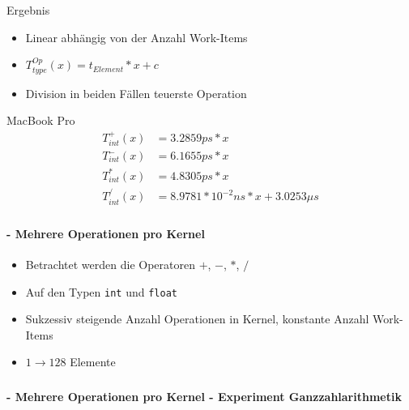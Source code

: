 \documentclass{beamer}
\begin{document}
\begin{frame}
	\frametitle{}
	\framesubtitle{}
	\begin{block}{Ergebnis}
		\begin{itemize}
			\item Linear abhängig von der Anzahl Work-Items
			\item $T^{Op}_{type}(x) = t_{Element}*x+c$
			\item Division in beiden Fällen teuerste Operation
		\end{itemize}	
	\end{block}
	\begin{block}{MacBook Pro}
		\begin{align*}
			T^{+}_{int}(x) &= 3.2859 ps*x\\
			T^{-}_{int}(x) &= 6.1655 ps*x\\
			T^{*}_{int}(x) &= 4.8305 ps*x\\
			T^{/}_{int}(x) &= 8.9781 * 10^{-2}ns*x+3.0253\mu s	
		\end{align*}
	\end{block}
\end{frame}

\begin{frame}
	\frametitle{}
	\framesubtitle{ - Mehrere Operationen pro Kernel}
	\begin{itemize}
		\item Betrachtet werden die Operatoren $+$, $-$, $*$, $/$
		\item  Auf den Typen \texttt{int} und \texttt{float}
		\item Sukzessiv steigende Anzahl Operationen in Kernel, konstante Anzahl Work-Items
		\item $1 \rightarrow 128$ Elemente
	\end{itemize}
\end{frame}

\begin{frame}
	\frametitle{}
	\framesubtitle{ - Mehrere Operationen pro Kernel - Experiment Ganzzahlarithmetik}
	\begin{figure}[h]
		\centering
	\end{figure}
\end{frame}
\end{document}
